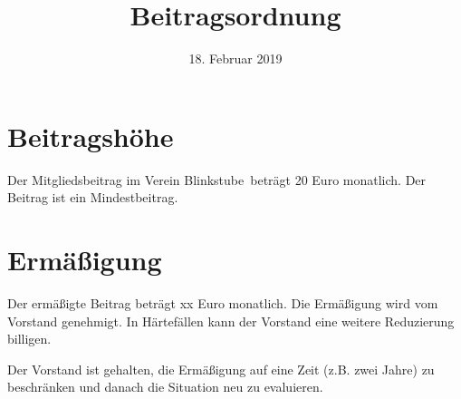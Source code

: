 \documentclass[a4paper, 12pt]{scrartcl}
\title{Beitragsordnung}
\subtitle{\verein}
\author{}
\date{18. Februar 2019}
\newcommand\verein{Blinkstube}
\begin{document}
\maketitle
\sffamily

\section{Beitragshöhe}

Der Mitgliedsbeitrag im Verein \verein\ beträgt 20 Euro monatlich. Der Beitrag
ist ein Mindestbeitrag.

\section{Ermäßigung}

Der ermäßigte Beitrag beträgt xx Euro monatlich. Die Ermäßigung wird vom
Vorstand genehmigt. In Härtefällen kann der Vorstand eine weitere Reduzierung
billigen.

Der Vorstand ist gehalten, die Ermäßigung auf eine Zeit (z.B. zwei Jahre) zu
beschränken und danach die Situation neu zu evaluieren.
\end{document}
